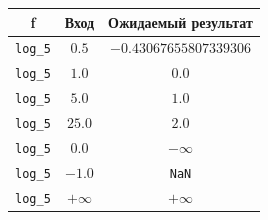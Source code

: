 \documentclass[12pt,a4paper]{report}
\begin{document}
\begin{center}
    \begin{tabular}{|c|c|c|}
        \hline
        \textbf{f} & \textbf{Вход} & \textbf{Ожидаемый результат} \\
        \hline
        \texttt{log\_5} & $0.5$ & $-0.43067655807339306$ \\
        \hline
        \texttt{log\_5} & $1.0$ & $0.0$ \\
        \hline
        \texttt{log\_5} & $5.0$ & $1.0$ \\
        \hline
        \texttt{log\_5} & $25.0$ & $2.0$ \\
        \hline
        \texttt{log\_5} & $0.0$ & $-\infty$ \\
        \hline
        \texttt{log\_5} & $-1.0$ & \texttt{NaN} \\
        \hline
        \texttt{log\_5} & $+\infty$ & $+\infty$ \\
        \hline
    \end{tabular}
\end{center}
\end{document}
